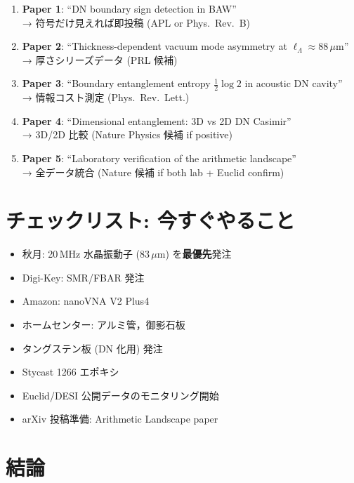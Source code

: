 \documentclass[11pt,a4paper]{article}
\begin{document}
\begin{enumerate}
\item \textbf{Paper 1}: ``DN boundary sign detection in BAW'' \\
→ 符号だけ見えれば即投稿 (APL or Phys.\ Rev.\ B)

\item \textbf{Paper 2}: ``Thickness-dependent vacuum mode asymmetry
at $\ell_\Lambda \approx 88\,\mu$m'' \\
→ 厚さシリーズデータ (PRL 候補)

\item \textbf{Paper 3}: ``Boundary entanglement entropy
$\frac{1}{2}\log 2$ in acoustic DN cavity'' \\
→ 情報コスト測定 (Phys.\ Rev.\ Lett.)

\item \textbf{Paper 4}: ``Dimensional entanglement: 3D vs 2D DN
Casimir'' \\
→ 3D/2D 比較 (Nature Physics 候補 if positive)

\item \textbf{Paper 5}: ``Laboratory verification of the arithmetic
landscape'' \\
→ 全データ統合 (Nature 候補 if both lab + Euclid confirm)
\end{enumerate}

\section{チェックリスト: 今すぐやること}

\begin{itemize}
\item[$\square$] 秋月: 20\,MHz 水晶振動子 (83\,$\mu$m) を\textbf{最優先}発注
\item[$\square$] Digi-Key: SMR/FBAR 発注
\item[$\square$] Amazon: nanoVNA V2 Plus4
\item[$\square$] ホームセンター: アルミ管，御影石板
\item[$\square$] タングステン板 (DN 化用) 発注
\item[$\square$] Stycast 1266 エポキシ
\item[$\square$] Euclid/DESI 公開データのモニタリング開始
\item[$\square$] arXiv 投稿準備: Arithmetic Landscape paper
\end{itemize}

\section{結論}
\end{document}
